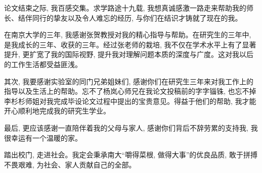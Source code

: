 \documentclass[macfonts,master,oneside]{njuthesis}
\begin{document}








% 

\begin{acknowledgement}

论文结束之际, 我百感交集。求学路途十九载, 我想真诚感激一路走来帮助我的师长、结伴同行的挚友以及令人难忘的经历, 与你们在结识才铸就了现在的我。

在南京大学的三年, 我感谢张贺教授对我的精心指导与帮助。在研究生的三年中, 是我成长的三年、收获的三年。经过张老师的栽培, 我不仅在学术水平上有了显著提升, 更扩宽了我的国际视野, 提升我对理解问题本质的深度与广度。这对我以后的工作生活都受益匪浅。

其次, 我要感谢实验室的同门兄弟姐妹们, 感谢你们在研究生三年来对我工作上的指导以及生活上的帮助。忘不了杨岚心师兄在我论文投稿前的字字锱铢, 也忘不掉李杉杉师姐对我完成毕设论文过程中提出的宝贵意见。得益于他们的帮助, 我才能开心顺利地完成我的研究生学业。

最后, 更应该感谢一直陪伴着我的父母与家人, 感谢你们背后不辞劳累的支持我, 我很幸运有一个温暖的家。

踏出校门, 走进社会。我定会秉承南大“嚼得菜根, 做得大事”的优良品质, 敢于拼搏不畏艰难, 为社会、家人贡献自己的全部。


\end{acknowledgement}





\end{document}
